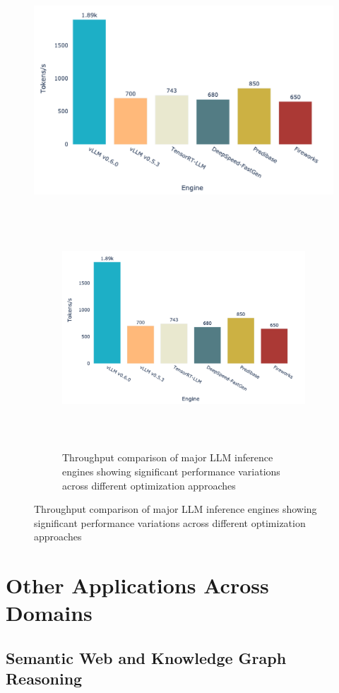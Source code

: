 \documentclass[12pt,a4paper]{article}
\begin{document}
\begin{figure}[htbp]
\centering
\includegraphics[width=\textwidth]{llm_comparison.png}
\begin{figure}
    \centering
    \includegraphics[width=\linewidth, height=9cm, keepaspectratio]{llm_comparison.png}
    \caption{Throughput comparison of major LLM inference engines showing significant performance variations across different optimization approaches}
\label{fig:throughput_comparison}
\end{figure}
\end{figure}

\section{Other Applications Across Domains}

\subsection{Semantic Web and Knowledge Graph Reasoning}
\end{document}
